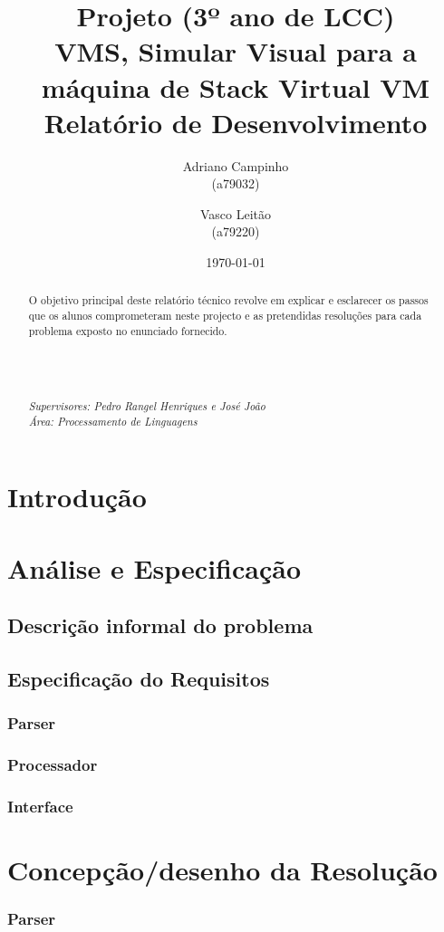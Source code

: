 \documentclass{report}
\title{Projeto (3º ano de LCC)\\ \textbf{VMS, Simular Visual para a máquina de Stack Virtual VM}\\ Relatório de Desenvolvimento}
\author{Adriano Campinho\\ (a79032) \and Vasco Leitão\\ (a79220) }
\date{\today}
\def\supers#1{{\em Supervisores: #1}\\ }
\def\area#1{{\em \'{A}rea: #1}\\[0.2cm]}
\begin{document}
\maketitle
\begin{abstract}
	\quad O objetivo principal deste relatório técnico revolve em explicar e esclarecer os passos
	que os alunos comprometeram neste projecto e as pretendidas resoluções
	para cada problema exposto no enunciado fornecido. \\
	\\
	\\
	\\
  \\
	\supers{Pedro Rangel Henriques e José João}
	\area{Processamento de Linguagens}

\end{abstract}

\tableofcontents

\chapter{Introdução} \label{intro}

\chapter{Análise e Especificação} \label{ae}
\section{Descrição informal do problema}
\section{Especificação do Requisitos}
\subsection{Parser}
\subsection{Processador}
\subsection{Interface}

\chapter{Concepção/desenho da Resolução}
\subsection{Parser}
\end{document}
